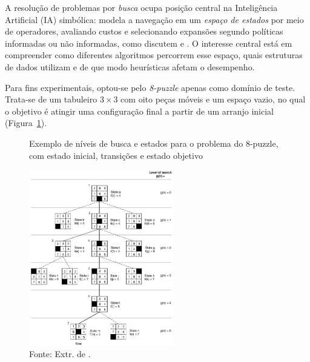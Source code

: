 
A resolução de problemas por \emph{busca} ocupa posição central na Inteligência Artificial (IA) simbólica: modela a 
navegação em um \emph{espaço de estados} por meio de operadores, avaliando custos e selecionando expansões 
segundo políticas informadas ou não informadas, como discutem  e 
. O interesse central está em compreender como diferentes algoritmos percorrem esse espaço, 
quais estruturas de dados utilizam e de que modo heurísticas afetam o desempenho.

Para fins experimentais, optou-se pelo \emph{8-puzzle} apenas como domínio de teste. Trata-se de um tabuleiro 
$3\times 3$ com oito peças móveis e um espaço vazio, no qual o objetivo é atingir uma configuração final a partir 
de um arranjo inicial (Figura~\ref{fig:8puzzle}).
\vspace{-0.2cm}
\begin{figure}[H]
    \centering
    \caption{Exemplo de níveis de busca e estados para o problema do 8-puzzle, com estado inicial, transições e estado objetivo}
    \vspace{-0.5cm}
    \includegraphics[width=0.56\textwidth]{Imagens/FiguraBuscaEstadosLuger.png}
    \caption*{Fonte: Extr. de .}
    \label{fig:8puzzle}
\end{figure}


